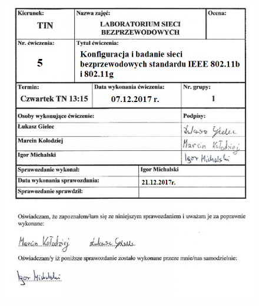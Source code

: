 \documentclass[12pt, a4paper, oneside]{article}
\begin{document}
\begin{titlepage}
\begin{figure}[h]
\centering
\includegraphics[scale=1]{pics/tp.png}
\end{figure}
\clearpage
\end{titlepage}
\end{document}
